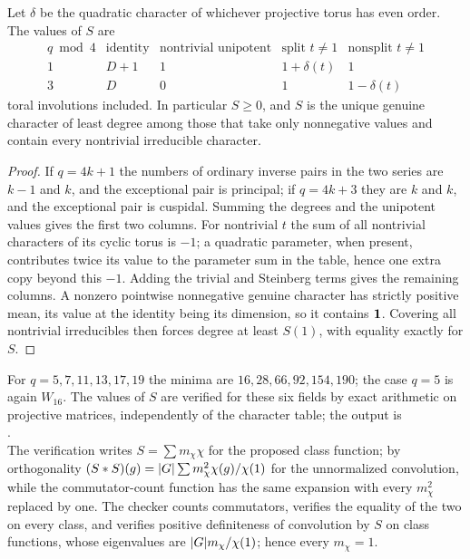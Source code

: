 \begin{theorem}\label{grp:thm:odd-gelfand}
Let $\delta$ be the quadratic character of whichever projective torus has even
order. The values of $S$ are
\[
\begin{array}{c|cccc}
q\bmod4 &\text{identity}&\text{nontrivial unipotent}
 &\text{split }t\ne1&\text{nonsplit }t\ne1\\ \hline
1&D+1&1&1+\delta(t)&1\\
3&D&0&1&1-\delta(t)
\end{array}
\]
toral involutions included. In particular $S\ge0$, and $S$ is the unique
genuine character of least degree among those that take only nonnegative
values and contain every nontrivial irreducible character.
\end{theorem}

\begin{proof}
If $q=4k+1$ the numbers of ordinary inverse pairs in the two series are $k-1$
and $k$, and the exceptional pair is principal; if $q=4k+3$ they are $k$ and
$k$, and the exceptional pair is cuspidal. Summing the degrees and the
unipotent values gives the first two columns. For nontrivial $t$ the sum of
all nontrivial characters of its cyclic torus is $-1$; a quadratic parameter,
when present, contributes twice its value to the parameter sum in the table,
hence one extra copy beyond this $-1$. Adding the trivial and Steinberg terms
gives the remaining columns. A nonzero pointwise nonnegative genuine character
has strictly positive mean, its value at the identity being its dimension, so
it contains $\mathbf{1}$. Covering all nontrivial irreducibles then forces degree
at least $S(1)$, with equality exactly for $S$.
\end{proof}

For $q=5,7,11,13,17,19$ the minima are $16,28,66,92,154,190$; the case $q=5$
is again $W_{16}$. The values of $S$ are verified for these six fields by
exact arithmetic on projective matrices, independently of the character
table; the output is\\
.\\
The verification writes $S=\sum m_\chi\chi$ for the proposed class function;
by orthogonality $(S*S)(g)=\lvert G\rvert\sum m_\chi^2\chi(g)/\chi(1)$ for the
unnormalized convolution, while the commutator-count function has the same
expansion with every $m_\chi^2$ replaced by one. The checker counts
commutators, verifies the equality of the two on every class, and verifies
positive definiteness of convolution by $S$ on class functions, whose
eigenvalues are $\lvert G\rvert m_\chi/\chi(1)$; hence every $m_\chi=1$.

